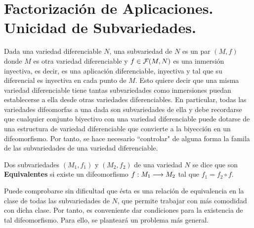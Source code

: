 \documentclass[Cursovd_portada.tex]{subfiles}
\begin{document}
\section{Factorización de Aplicaciones. Unicidad de Subvariedades.}
\hs Dada una variedad diferenciable $N$, una subvariedad de $N$ es un par $(M,f)$ donde $M$ es otra variedad
diferenciable y $f\in{\cal F}(M,N)$ es una inmersión inyectiva, es decir, es una aplicación diferenciable,
inyectiva y tal que su diferencial es inyectiva en cada punto de $M$. Esto quiere decir que una misma variedad
diferenciable tiene tantas subvariedades como inmersiones puedan establecerse a ella desde otras variedades
diferenciables. En particular, todas las variedades difeomorfas a una dada son subvariedades de ella y debe
recordarse que cualquier conjunto biyectivo con una variedad diferenciable puede dotarse de una estructura de
variedad diferenciable que convierte a la biyección en un difeomorfismo. Por tanto, se hace necesario ``controlar"
de alguna forma la famila de las subvariedades de una variedad diferenciable.
\begin{defi}
Dos subvariedades $(M_1,f_1)$ y $(M_2,f_2)$ de una variedad $N$ se
dice que son {\bf Equivalentes} si existe un difeomorfismo
$f:M_1\longrightarrow M_2$ tal que $f_1=f_2\circ f$.
\end{defi}
\hs Puede comprobarse sin dificultad que ésta es una
relación de equivalencia en la clase de todas las
subvariedades de $N$, que permite trabajar con más comodidad
con dicha clase. Por tanto, es conveniente dar condiciones para la
existencia de tal difeomorfismo. Para ello, se planteará un
problema más general.
\end{document}
